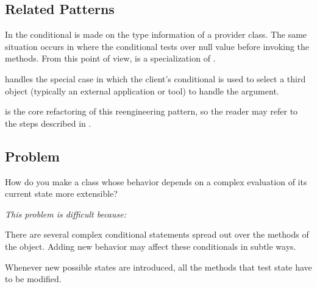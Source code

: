 \documentclass[a4paper,10pt,twoside]{book}
\begin{document}
\subsection*{Related Patterns}

In the conditional is made on the type information of a provider class. The same situation occurs in  where the conditional tests over null value before invoking the methods. From this point of view,  is a specialization of . 

 handles the special case in which the client's conditional is used to select a third object (typically an external application or tool) to handle the argument.

 is the core refactoring of this reengineering pattern, so the reader may refer to the steps described in \cite{Fowl99a}.




\subsection*{Problem}

How do you make a class whose behavior depends on a complex evaluation of its current state more extensible?

\emph{This problem is difficult because:}

\begin{bulletlist}
\item There are several complex conditional statements spread out over the methods of the object. Adding new behavior may affect these conditionals in subtle ways.

\item Whenever new possible states are introduced, all the methods that test state have to be modified.
\end{bulletlist}
\end{document}
